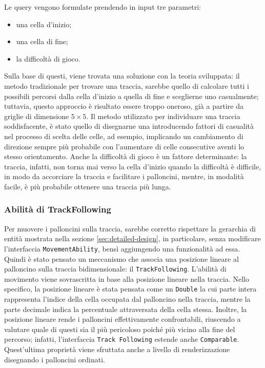 

Le query vengono formulate prendendo in input tre parametri:
\begin{itemize}
    \item una cella d'inizio;
    \item una cella di fine;
    \item la difficoltà di gioco.
\end{itemize}

Sulla base di questi, viene trovata una soluzione con la teoria sviluppata: il metodo tradizionale per trovare una
traccia, sarebbe quello di calcolare tutti i possibili percorsi dalla cella d'inizio a quella di fine e sceglierne uno
casualmente; tuttavia, questo approccio è risultato essere troppo oneroso, già a partire da griglie di dimensione
$5 \times 5$. Il metodo utilizzato per individuare una traccia soddisfacente, è stato quello di disegnarne una
introducendo fattori di casualità nel processo di scelta delle celle, ad esempio, implicando un cambiamento di direzione
sempre più probabile con l'aumentare di celle consecutive aventi lo stesso orientamento. Anche la difficoltà di gioco
è un fattore determinante: la traccia, infatti, non torna mai verso la cella d'inizio quando la difficoltà è difficile,
in modo da accorciare la traccia e facilitare i palloncini, mentre, in modalità facile, è più probabile ottenere una
traccia più lunga.

\subsubsection{Abilità di TrackFollowing}
Per muovere i palloncini sulla traccia, sarebbe corretto rispettare la gerarchia di entità mostrata nella sezione
\ref{sec:detailed-design}, in particolare, senza modificare l'interfaccia \texttt{MovementAbility}, bensì aggiungendo una
funzionalità ad essa. Quindi è stato pensato un meccanismo che associa una posizione lineare al palloncino sulla
traccia bidimensionale: il \texttt{TrackFollowing}. L'abilità di movimento viene sovrascritta in base alla posizione
lineare nella traccia. Nello specifico, la posizione lineare è stata pensata come un \texttt{Double} la cui parte
intera rappresenta l'indice della cella occupata dal palloncino nella traccia, mentre la parte decimale indica la
percentuale attraversata della cella stessa. Inoltre, la posizione lineare rende i palloncini effettivamente confrontabili,
riuscendo a valutare quale di questi sia il più pericoloso poiché più vicino alla fine del percorso;
infatti, l'interfaccia \texttt{Track Following} estende anche \texttt{Comparable}. Quest'ultima proprietà viene sfruttata
anche a livello di renderizzazione disegnando i palloncini ordinati.

